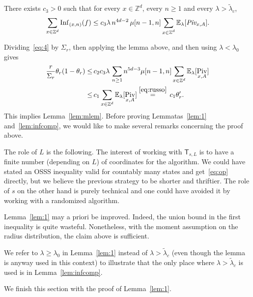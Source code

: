 \documentclass[AHL,Unicode,longabstracts]{cedram}
\DeclareMathOperator{\Inf}{Inf}
\DeclareMathOperator{\Piv}{Piv}
\begin{document}
\begin{lemm}\label{lem:infcomp}

There exists $c_3>0$ such that for every $x\in {\mathbb Z}^d$, every $n\ge1$ and every $\lambda>\widetilde\lambda_c$,
\[
\sum_{x \in {\mathbb Z}^d} {\Inf}_{(x,n)}(f)\le c_3 \lambda \, n^{4d-2}\, \mu[n-1,n]\sum_{\substack{x\in{\mathbb Z}^d}} {\mathbb E}_\lambda [\emph{Piv}_{x,A}].
\]
\end{lemm}

Dividing~\eqref{eq:4} by $\Sigma_r$, then applying the lemma above, and then using $ \lambda < \lambda_0$ gives
\begin{align*}
\frac r{\Sigma_r}\theta_{r}(1-\theta_{r}) \leq \,&c_2c_3 \lambda \, \sum_{n\ge1} n^{5d-3}\mu[n-1,n] \sum_{x\in{\mathbb Z}^d}{\mathbb E}_\lambda [\Piv_{x,A}] \\
\le \,&c_1\sum_{x\in{\mathbb Z}^d}{\mathbb E}_\lambda [\Piv_{x,A}] \stackrel{\eqref{eq:russo}}{=}\, c_1 \theta'_r.
\end{align*}
This implies Lemma~\ref{lem:mlem}. Before proving Lemmatas~\ref{lem:1} and~\ref{lem:infcomp}, we would like to make several remarks concerning the proof above.

\begin{rema}
The role of $L$ is the following. The interest of working with $\mathsf T_{s,L}$ is to have a finite number (depending on $L$) of coordinates for the algorithm. We could have stated an OSSS inequality valid for countably many states and get~\eqref{eq:op} directly, but we believe the previous strategy to be shorter and thriftier. The role of $s$ on the other hand is purely technical and one could have avoided it by working with a randomized algorithm.
\end{rema}

\begin{rema}
Lemma~\ref{lem:1} may a priori be improved. Indeed, the union bound in the first inequality is quite wasteful. Nonetheless, with the moment assumption on the radius distribution, the claim above is sufficient.
\end{rema}


\begin{rema}
We refer to $\lambda\ge \lambda_0$ in Lemma~\ref{lem:1} instead of $\lambda>\widetilde\lambda_c$ (even though the lemma is anyway used in this context) to illustrate that the only place where $\lambda>\widetilde\lambda_c$ is used is in Lemma~\ref{lem:infcomp}.
\end{rema}

We finish this section with the proof of Lemma~\ref{lem:1}.
\end{document}

